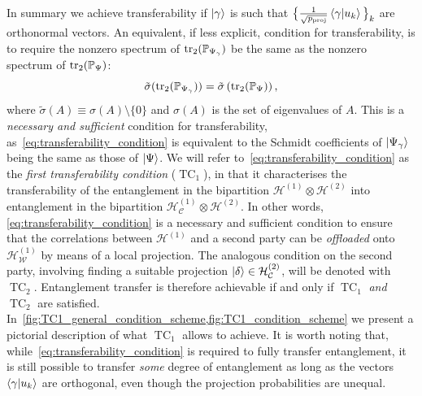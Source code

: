 \documentclass[
	aps, pra,
	superscriptaddress, twocolumn,
	floatfix,
	10pt
]{revtex4-1}
\newcommand{\on}[1]{\operatorname{#1}}
\newcommand{\parTitle}[1]{\noindent{\color{Mahogany}(\emph{#1})}}
\newcommand{\PP}{\mathbb{P}}
\newcommand{\calC}{{\mathcal{C}}}
\newcommand{\calH}{{\mathcal{H}}}
\newcommand{\calW}{{\mathcal{W}}}
\newcommand{\HC}{\calH_\calC}
\newcommand{\HW}{\calH_\calW}
\renewcommand{\parTitle}[1]{}
\begin{document}
\parTitle{Summary of conclusions}
In summary we achieve transferability if $\ket\gamma$ is such that
$\big\{\frac{1}{\sqrt{p_{\on{proj}}}}\braket{\gamma}{u_k}\big\}_k$ are orthonormal vectors.
An equivalent, if less explicit, condition for transferability, is to require the nonzero spectrum of $\tr_2(\PP_{\Psi_\gamma})$ be the same as the nonzero spectrum of $\tr_2(\PP_\Psi)$:
\begin{equation}
    \tilde\sigma(\tr_2(\PP_{\Psi_\gamma})) =
    \tilde\sigma\left(
        \tr_2(\PP_\Psi)
    \right),
    \label{eq:transferability_condition}
\end{equation}
where $\tilde\sigma(A)\equiv\sigma(A)\setminus\{0\}$ and $\sigma(A)$ is the set of eigenvalues of $A$.
This is a \emph{necessary and sufficient} condition for transferability, as~\eqref{eq:transferability_condition} is equivalent to the Schmidt coefficients of $\ket{\Psi_\gamma}$ being the same as those of $\ket{\Psi}$.
We will refer to~\eqref{eq:transferability_condition} as the \emph{first transferability condition} ($\on{TC}_1$), in that it characterises the transferability of the entanglement in the bipartition $\calH^{(1)}\otimes\calH^{(2)}$ into entanglement in the bipartition $\HC^{(1)}\otimes\calH^{(2)}$.
In other words, \eqref{eq:transferability_condition} is a necessary and sufficient condition to ensure that the correlations between $\calH^{(1)}$ and a second party can be \emph{offloaded} onto $\HW^{(1)}$ by means of a local projection.
The analogous condition on the second party, involving finding a suitable projection $\ket\delta\in\HC^{(2)}$, will be denoted with $\on{TC}_2$.
Entanglement transfer is therefore achievable if and only if $\on{TC}_1$ \emph{and} $\on{TC}_2$ are satisfied.
In~\cref{fig:TC1_general_condition_scheme,fig:TC1_condition_scheme} we present a pictorial description of what $\on{TC}_1$ allows to achieve.
It is worth noting that, while~\cref{eq:transferability_condition} is required to fully transfer entanglement, it is still possible to transfer \textit{some} degree of entanglement as long as the vectors  $\braket{\gamma}{u_k}$ are orthogonal, even though the projection probabilities are unequal.
\end{document}
